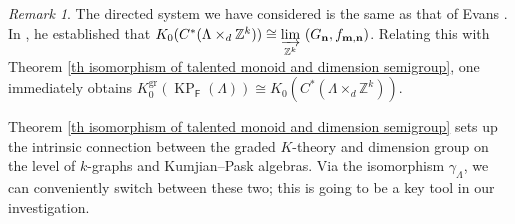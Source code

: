 \documentclass[12pt]{amsart}
\newcommand{\ZZ}{\mathbb{Z}}
\newcommand{\N}{\mathbf{n}}
\newcommand{\M}{\mathbf{m}}
\newcommand{\KP}{\operatorname{KP}}
\theoremstyle{definition}
\theoremstyle{remark}
\newtheorem{rmk}[thm]{Remark}
\newcommand{\gr}{\operatorname{gr}}
\begin{document}
\begin{rmk}\label{rem Connecting K-theory of Kp-algebra and C*-algebra}
The directed system we have considered is the same as that of Evans \cite{Evans}. In \cite[Lemma 3.9]{Evans}, he established that $K_0(C^*(\Lambda\times_d \ZZ^k))\cong \displaystyle{\varinjlim_{\mathbb{Z}^k}}~ (G_\N,f_{\M,\N})$. Relating this with Theorem \ref{th isomorphism of talented monoid and dimension semigroup}, one immediately obtains $K_0^{\gr}(\KP_\mathsf{F}(\Lambda))\cong K_0(C^*(\Lambda\times_d \ZZ^k))$. 
\end{rmk}

Theorem \ref{th isomorphism of talented monoid and dimension semigroup} sets up the intrinsic connection between the graded $K$-theory and dimension group on the level of $k$-graphs and Kumjian--Pask algebras. Via the isomorphism $\gamma_\Lambda$, we can conveniently switch between these two; this is going to be a key tool in our investigation. 
\end{document}
